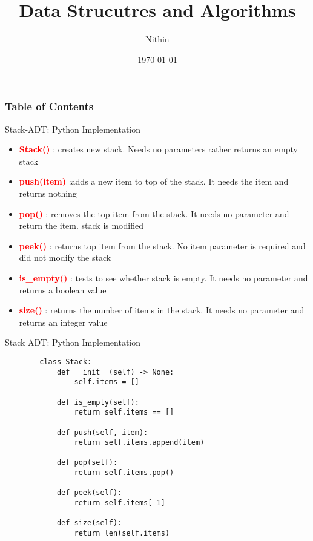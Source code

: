 \documentclass{beamer}
\title{Data Strucutres and Algorithms}
\author{Nithin}
\institute{}
\date{\today}
\begin{document}
\frame{\titlepage}

\begin{frame}
    \frametitle{Table of Contents}
    \tableofcontents
\end{frame}

\begin{frame}{Stack-ADT: Python Implementation}
    \begin{itemize}
        \item \textcolor{red}{\textbf{Stack()}} : creates new stack. Needs no parameters rather returns an empty stack
        \item  \textcolor{red}{\textbf{push(item)}} :adds a new item to top of the stack. It needs the item and returns nothing
        \item \textcolor{red}{\textbf{pop()}} : removes the top item from the stack. It needs no parameter and return the item. stack is modified
        \item \textcolor{red}{\textbf{peek()}} : returns top item from the stack. No item parameter is required and did not modify the stack
        \item \textcolor{red}{\textbf{is\_empty()}} : tests to see whether stack is empty. It needs no parameter and returns a boolean value
        \item \textcolor{red}{\textbf{size()}} :  returns the number of items in the stack. It needs no parameter and returns an integer value
    \end{itemize}
\end{frame}
\begin{frame}[fragile]{Stack ADT: Python Implementation}
    \begin{lstlisting}
        class Stack:
            def __init__(self) -> None:
                self.items = []

            def is_empty(self):
                return self.items == []

            def push(self, item):
                return self.items.append(item)

            def pop(self):
                return self.items.pop()

            def peek(self):
                return self.items[-1]

            def size(self):
                return len(self.items)
    \end{lstlisting}
\end{frame}
\end{document}
